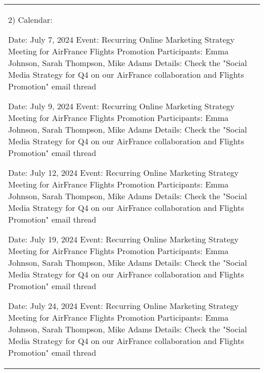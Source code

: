 \begin{table*}[!ht]
    \centering
    \begin{tabular}{p{}}
    \toprule
    

    2) Calendar: \newline

        Date: July 7, 2024 \newline
        Event: Recurring Online Marketing Strategy Meeting for AirFrance Flights Promotion \newline
        Participants: Emma Johnson, Sarah Thompson, Mike Adams \newline
        Details: Check the "Social Media Strategy for Q4 on our AirFrance collaboration and Flights Promotion" email thread \newline

        Date: July 9, 2024 \newline
        Event: Recurring Online Marketing Strategy Meeting for AirFrance Flights Promotion \newline
        Participants: Emma Johnson, Sarah Thompson, Mike Adams \newline
        Details: Check the "Social Media Strategy for Q4 on our AirFrance collaboration and Flights Promotion" email thread \newline

        Date: July 12, 2024 \newline
        Event: Recurring Online Marketing Strategy Meeting for AirFrance Flights Promotion \newline
        Participants: Emma Johnson, Sarah Thompson, Mike Adams \newline
        Details: Check the "Social Media Strategy for Q4 on our AirFrance collaboration and Flights Promotion" email thread \newline

        Date: July 19, 2024 \newline 
        Event: Recurring Online Marketing Strategy Meeting for AirFrance Flights Promotion \newline
        Participants: Emma Johnson, Sarah Thompson, Mike Adams \newline
        Details: Check the "Social Media Strategy for Q4 on our AirFrance collaboration and Flights Promotion" email thread \newline

        Date: July 24, 2024 \newline
        Event: Recurring Online Marketing Strategy Meeting for AirFrance Flights Promotion \newline
        Participants: Emma Johnson, Sarah Thompson, Mike Adams \newline
        Details: Check the "Social Media Strategy for Q4 on our AirFrance collaboration and Flights Promotion" email thread \newline
 

\end{tabular}
\end{table*}
